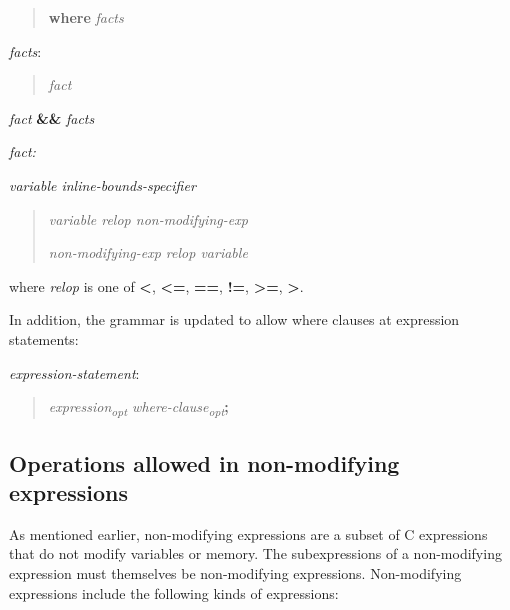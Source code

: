 \documentclass[]{article}
\begin{document}
\begin{quote}
\textbf{where} \emph{facts}
\end{quote}

\emph{facts}:

\begin{quote}
\emph{fact}
\end{quote}

\emph{fact} \textbf{\&\&} \emph{facts}

\emph{fact: }

\emph{variable inline-bounds-specifier}

\begin{quote}
\emph{variable relop non-modifying-exp}

\emph{non-modifying-exp relop variable}
\end{quote}

where \emph{relop} is one of \textbf{\textless{}},
\textbf{\textless{}=}, \textbf{==}, \textbf{!=},
\textbf{\textgreater{}=}, \textbf{\textgreater{}}.

In addition, the grammar is updated to allow where clauses at expression
statements:

\emph{expression-statement}:

\begin{quote}
\emph{expression\textsubscript{opt}
where-clause\textsubscript{opt}}\textbf{;}
\end{quote}

\subsection{\texorpdfstring{\protect\hypertarget{ux5fToc435434937}{}{\protect\hypertarget{ux5fToc437460758}{}{\protect\hypertarget{ux5fToc440445436}{}{\protect\hypertarget{ux5fToc440449218}{}{\protect\hypertarget{ux5fToc440551868}{}{}}}}}Operations
allowed in non-modifying
expressions}{Operations allowed in non-modifying expressions}}\label{operations-allowed-in-non-modifying-expressions}

As mentioned earlier, non-modifying expressions are a subset of C
expressions that do not modify variables or memory. The subexpressions
of a non-modifying expression must themselves be non-modifying
expressions. Non-modifying expressions include the following kinds of
expressions:
\end{document}
